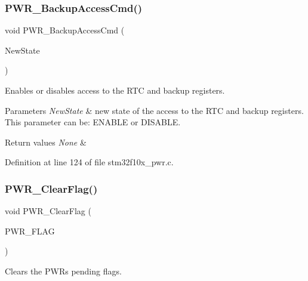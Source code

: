 \subsubsection{\texorpdfstring{P\+W\+R\+\_\+\+Backup\+Access\+Cmd()}{PWR\_BackupAccessCmd()}}
{\footnotesize\ttfamily void P\+W\+R\+\_\+\+Backup\+Access\+Cmd (\begin{DoxyParamCaption}\item[{\hyperlink{group___exported__types_gac9a7e9a35d2513ec15c3b537aaa4fba1}{Functional\+State}}]{New\+State }\end{DoxyParamCaption})}



Enables or disables access to the R\+TC and backup registers. 


\begin{DoxyParams}{Parameters}
{\em New\+State} & new state of the access to the R\+TC and backup registers. This parameter can be\+: E\+N\+A\+B\+LE or D\+I\+S\+A\+B\+LE. \\
\hline
\end{DoxyParams}

\begin{DoxyRetVals}{Return values}
{\em None} & \\
\hline
\end{DoxyRetVals}


Definition at line 124 of file stm32f10x\+\_\+pwr.\+c.

\mbox{\label{group___p_w_r___exported___functions_ga01c4b2fbd16514b993324e101c3ddf7c}} 
\subsubsection{\texorpdfstring{P\+W\+R\+\_\+\+Clear\+Flag()}{PWR\_ClearFlag()}}
{\footnotesize\ttfamily void P\+W\+R\+\_\+\+Clear\+Flag (\begin{DoxyParamCaption}\item[{uint32\+\_\+t}]{P\+W\+R\+\_\+\+F\+L\+AG }\end{DoxyParamCaption})}



Clears the P\+WR\textquotesingle{}s pending flags. 


